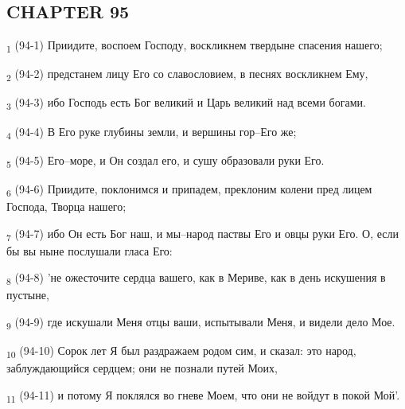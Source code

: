 \subsection{CHAPTER 95}
\begin{tcolorbox}
\textsubscript{1} (94-1) Приидите, воспоем Господу, воскликнем твердыне спасения нашего;
\end{tcolorbox}
\begin{tcolorbox}
\textsubscript{2} (94-2) предстанем лицу Его со славословием, в песнях воскликнем Ему,
\end{tcolorbox}
\begin{tcolorbox}
\textsubscript{3} (94-3) ибо Господь есть Бог великий и Царь великий над всеми богами.
\end{tcolorbox}
\begin{tcolorbox}
\textsubscript{4} (94-4) В Его руке глубины земли, и вершины гор--Его же;
\end{tcolorbox}
\begin{tcolorbox}
\textsubscript{5} (94-5) Его--море, и Он создал его, и сушу образовали руки Его.
\end{tcolorbox}
\begin{tcolorbox}
\textsubscript{6} (94-6) Приидите, поклонимся и припадем, преклоним колени пред лицем Господа, Творца нашего;
\end{tcolorbox}
\begin{tcolorbox}
\textsubscript{7} (94-7) ибо Он есть Бог наш, и мы--народ паствы Его и овцы руки Его. О, если бы вы ныне послушали гласа Его:
\end{tcolorbox}
\begin{tcolorbox}
\textsubscript{8} (94-8) 'не ожесточите сердца вашего, как в Мериве, как в день искушения в пустыне,
\end{tcolorbox}
\begin{tcolorbox}
\textsubscript{9} (94-9) где искушали Меня отцы ваши, испытывали Меня, и видели дело Мое.
\end{tcolorbox}
\begin{tcolorbox}
\textsubscript{10} (94-10) Сорок лет Я был раздражаем родом сим, и сказал: это народ, заблуждающийся сердцем; они не познали путей Моих,
\end{tcolorbox}
\begin{tcolorbox}
\textsubscript{11} (94-11) и потому Я поклялся во гневе Моем, что они не войдут в покой Мой'.
\end{tcolorbox}
